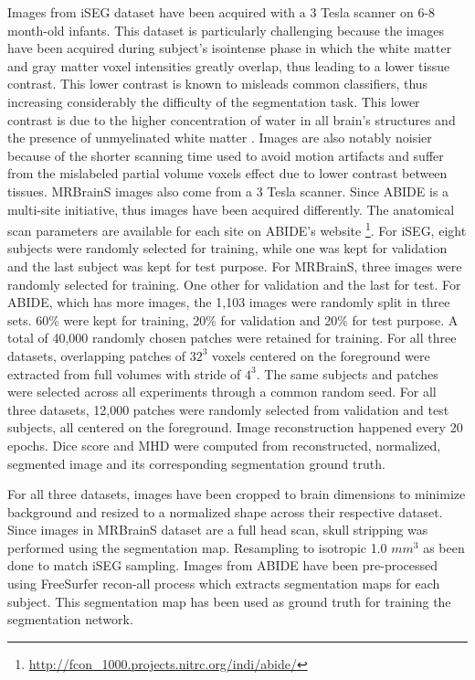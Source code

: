 \documentclass[preprint,12pt]{elsarticle}
\begin{document}
Images from iSEG dataset have been acquired with a 3 Tesla scanner on 6-8 month-old infants. This dataset is particularly challenging because the images have been acquired during subject's isointense phase in which the white matter and gray matter voxel intensities greatly overlap, thus leading to a lower tissue contrast. This lower contrast is known to misleads common classifiers, thus increasing considerably the difficulty of the segmentation task. This lower contrast is due to the higher concentration of water in all brain's structures and the presence of unmyelinated white matter \cite{Xue2007}. Images are also notably noisier because of the shorter scanning time used to avoid motion artifacts and suffer from the mislabeled partial volume voxels effect due to lower contrast between tissues. MRBrainS images also come from a 3 Tesla scanner. Since ABIDE is a multi-site initiative, thus images have been acquired differently. The anatomical scan parameters are available for each site on ABIDE's website \footnote{\url{http://fcon_1000.projects.nitrc.org/indi/abide/}}. For iSEG, eight subjects were randomly selected for training, while one was kept for validation and the last subject was kept for test purpose. For MRBrainS, three images were randomly selected for training. One other for validation and the last for test. For ABIDE, which has more images, the 1,103 images were randomly split in three sets. 60\% were kept for training, 20\% for validation and 20\% for test purpose. A total of 40,000 randomly chosen patches were retained for training. For all three datasets, overlapping patches of $32^3$ voxels centered on the foreground were extracted from full volumes with stride of $4^3$. The same subjects and patches were selected across all experiments through a common random seed. For all three datasets, 12,000 patches were randomly selected from validation and test subjects, all centered on the foreground. Image reconstruction happened every 20 epochs. Dice score and MHD were computed from reconstructed, normalized, segmented image and its corresponding segmentation ground truth.

For all three datasets, images have been cropped to brain dimensions to minimize background and resized to a normalized shape across their respective dataset. Since images in MRBrainS dataset are a full head scan, skull stripping was performed using the segmentation map. Resampling to isotropic 1.0 $mm^3$ as been done to match iSEG sampling. Images from ABIDE have been pre-processed using FreeSurfer recon-all process which extracts segmentation maps for each subject. This segmentation map has been used as ground truth for training the segmentation network.
\end{document}
